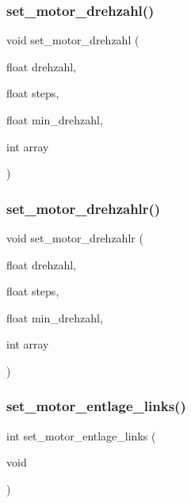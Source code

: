 \mbox{\label{motor_8h_a6d2fee194e066b565cd0b0cef1c17dcd}} 
\subsubsection{set\+\_\+motor\+\_\+drehzahl()}
{\footnotesize\ttfamily void set\+\_\+motor\+\_\+drehzahl (\begin{DoxyParamCaption}\item[{float}]{drehzahl,  }\item[{float}]{steps,  }\item[{float}]{min\+\_\+drehzahl,  }\item[{int}]{array }\end{DoxyParamCaption})}

\mbox{\label{motor_8h_a4d56786cf35908b2d634178d713b373e}} 
\subsubsection{set\+\_\+motor\+\_\+drehzahlr()}
{\footnotesize\ttfamily void set\+\_\+motor\+\_\+drehzahlr (\begin{DoxyParamCaption}\item[{float}]{drehzahl,  }\item[{float}]{steps,  }\item[{float}]{min\+\_\+drehzahl,  }\item[{int}]{array }\end{DoxyParamCaption})}

\mbox{\label{motor_8h_a8168802a949dff7a8df33ff38eaf0d20}} 
\subsubsection{set\+\_\+motor\+\_\+entlage\+\_\+links()}
{\footnotesize\ttfamily int set\+\_\+motor\+\_\+entlage\+\_\+links (\begin{DoxyParamCaption}\item[{void}]{ }\end{DoxyParamCaption})}



